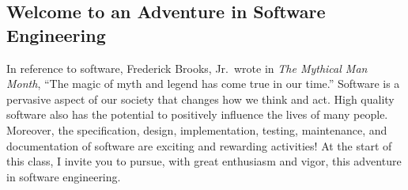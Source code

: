\documentclass[11pt]{article}
\begin{document}
\subsection*{Welcome to an Adventure in Software Engineering}

In reference to software, Frederick Brooks, Jr.\ wrote in {\em The Mythical Man
Month}, ``The magic of myth and legend has come true in our time.'' Software is
a pervasive aspect of our society that changes how we think and act. High
quality software also has the potential to positively influence the lives of
many people. Moreover, the specification, design, implementation, testing,
maintenance, and documentation of software are exciting and rewarding
activities! At the start of this class, I invite you to pursue, with great
enthusiasm and vigor, this adventure in software engineering.
\end{document}
